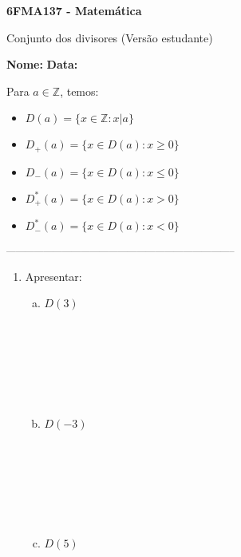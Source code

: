 \documentclass[a4paper,14pt]{article}
\begin{document}
	
	\noindent\textbf{6FMA137 - Matemática} 
	
	\begin{center}Conjunto dos divisores (Versão estudante)
	\end{center}
	
	\noindent\textbf{Nome:} \underline{\hspace{10cm}}
	\noindent\textbf{Data:} \underline{\hspace{4cm}}
	
	
	\begin{multicols}{2}
	    \noindent Para $a \in \mathbb{Z}$, temos: \\
	    \begin{itemize}
	    	\item $D(a) = \{x \in \mathbb{Z} : x|a\}$
	    	\item $D_+(a) = \{x \in D(a) : x \geq 0\}$
	    	\item $D_-(a) = \{x \in D(a) : x \leq 0\}$
	    	\item $D_+^*(a) = \{x \in D(a) : x > 0\}$
	    	\item $D_-^*(a) = \{x \in D(a) : x < 0\}$
	    \end{itemize}
		\noindent\textsubscript{--------------------------------------------------------------------------}
		\begin{enumerate} 
			\item Apresentar:
			\begin{enumerate}[a)]
				\item $D(3)$ \\\\\\\\\\\\\\
				\item $D(-3)$ \\\\\\\\\\\\\\
				\item $D(5)$ \\\\\\\\

\end{enumerate}
\end{enumerate}
\end{multicols}
\end{document}
